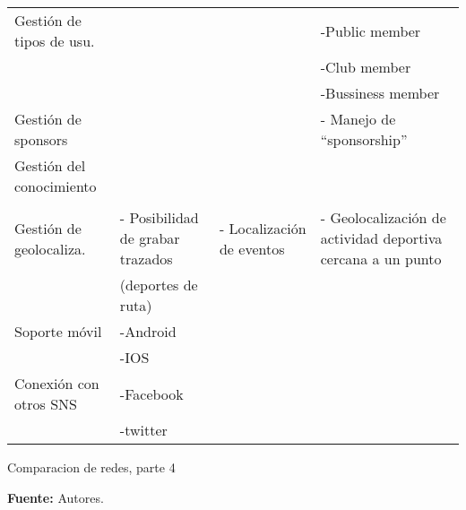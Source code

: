 \begin{landscape}
\begin{table}
\begin{center}
{\begin{tabular}{|p{4cm}|p{7cm}p{6cm}p{9cm}|}
 &  &  &  \\ 
\hline
Gestión de tipos de usu. &  &  & -Public member \\ 
 &  &  & -Club member \\ 
 &  &  & -Bussiness member \\ 
\hline
Gestión de sponsors &  &  & - Manejo de ``sponsorship'' \\ 
\hline
Gestión del conocimiento &  &  &  \\ 
 &  &  &  \\ 
\hline
Gestión de geolocaliza. & - Posibilidad de grabar trazados & - Localización de eventos & - Geolocalización de actividad deportiva cercana a un punto \\ 
 & (deportes de ruta) &  &  \\ 
\hline
Soporte móvil & -Android &  &  \\ 
 & -IOS &  &  \\ 
\hline
Conexión con otros SNS & -Facebook &  &  \\ 
 & -twitter &  &  \\ 
\hline
\end{tabular}
}
  
  \end{center}
\end{table}

\newpage

\begin{table}
  \caption{Comparacion de redes, parte 4}
  \label{tab:comparacion_redes_4}

  \begin{center}
  
  \textbf{Fuente:} Autores.
  

\end{center}
\end{table}
\end{landscape}
